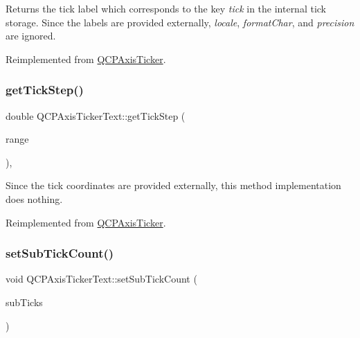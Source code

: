 Returns the tick label which corresponds to the key {\itshape tick} in the internal tick storage. Since the labels are provided externally, {\itshape locale}, {\itshape format\+Char}, and {\itshape precision} are ignored.

Reimplemented from \mbox{\hyperlink{class_q_c_p_axis_ticker}{Q\+C\+P\+Axis\+Ticker}}.

\mbox{\label{class_q_c_p_axis_ticker_text_a628f16c41905e8c95c6622d6757a38c4}} 
\subsubsection{\texorpdfstring{get\+Tick\+Step()}{getTickStep()}}
{\footnotesize\ttfamily double Q\+C\+P\+Axis\+Ticker\+Text\+::get\+Tick\+Step (\begin{DoxyParamCaption}\item[{const \mbox{\hyperlink{class_q_c_p_range}{Q\+C\+P\+Range}} \&}]{range }\end{DoxyParamCaption})\hspace{0.3cm}{\ttfamily [protected]}, {\ttfamily [virtual]}}

Since the tick coordinates are provided externally, this method implementation does nothing.

Reimplemented from \mbox{\hyperlink{class_q_c_p_axis_ticker}{Q\+C\+P\+Axis\+Ticker}}.

\mbox{\label{class_q_c_p_axis_ticker_text_a8cfa50c51183c90186892eeef978d571}} 
\subsubsection{\texorpdfstring{set\+Sub\+Tick\+Count()}{setSubTickCount()}}
{\footnotesize\ttfamily void Q\+C\+P\+Axis\+Ticker\+Text\+::set\+Sub\+Tick\+Count (\begin{DoxyParamCaption}\item[{int}]{sub\+Ticks }\end{DoxyParamCaption})}

